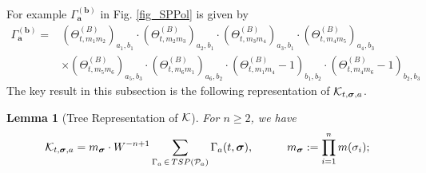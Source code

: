 \documentclass[10pt,reqno]{article}
\theoremstyle{plain} %
\newtheorem{lemma}[theorem]{Lemma}
\theoremstyle{remark}
\numberwithin{equation}{section}
\begin{document}
For example $\Gamma_{\textbf{a}}^{(\textbf{b})}$ in Fig. \ref{fig_SPPol} is given by 
\begin{align}   \nonumber
\Gamma_{\textbf{a}}^{(\textbf{b})}
=& (\Theta^{(B)}_{t, m_1 m_2})_{a_1, b_1} \cdot (\Theta^{(B)}_{t, m_2 m_3})_{a_2, b_1} \cdot (\Theta^{(B)}_{t, m_3 m_4})_{a_3, b_1} \cdot (\Theta^{(B)}_{t, m_4 m_5})_{a_4, b_3} \nonumber \\  \nonumber
& 
\times (\Theta^{(B)}_{t, m_5 m_6})_{a_5, b_3} \cdot (\Theta^{(B)}_{t, m_6 m_1})_{a_6, b_2}\cdot 
\left(\Theta^{(B)}_{t, m_1 m_4} -1\right)_{b_1, b_2}
\cdot
\left(\Theta^{(B)}_{t, m_4 m_6} -1\right)_{b_2, b_3} 
 \end{align}
The key result in this subsection is the following  representation of ${\cal K}_{t, \boldsymbol{\sigma}, \textbf{a}}$. %

\begin{lemma}[Tree Representation of $\cal K$]\label{Lemma_TRofK}
   For $n \ge 2$, we have
   \begin{equation}\label{eq_trcalK}
    {\cal K}_{t, \boldsymbol{\sigma}, \textbf{a}} =m_{\boldsymbol{\sigma}}\cdot W^{-n+1}\sum_{\Gamma_{\textbf{a}}\, \in\,  {TSP}({\cal P}_{\textbf{a}})} \Gamma_{ \textbf{a}}(t, \boldsymbol{\sigma}),\quad \quad \quad m_{\boldsymbol{\sigma}}:=\prod_{i=1}^n m(\sigma_i);
   \end{equation}  
\end{lemma}
\end{document}
